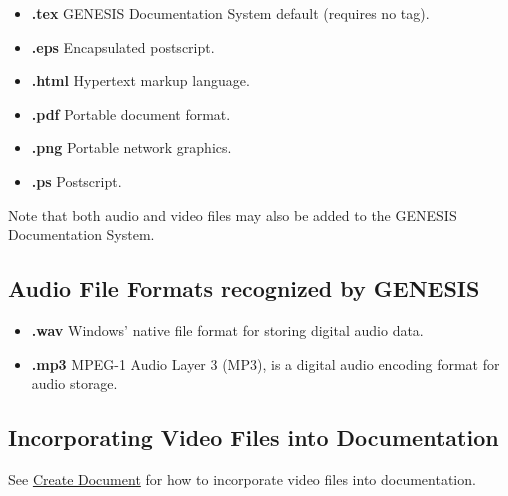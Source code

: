 \documentclass[12pt]{article}
\begin{document}
\begin{itemize}

\item[]{\bf .tex} GENESIS Documentation System default (requires no tag).
\item[]{\bf .eps} Encapsulated postscript.
\item[]{\bf .html} Hypertext markup language.
\item[]{\bf .pdf} Portable document format.
\item[]{\bf .png} Portable network graphics.
\item[]{\bf .ps} Postscript.

\end{itemize}
Note that both audio and video files may also be added to the GENESIS Documentation System.

\subsection*{Audio File Formats recognized by GENESIS}

\begin{itemize}

\item[]{\bf .wav} Windows' native file format for storing digital audio data.
\item[]{\bf .mp3} MPEG-1 Audio Layer 3 (MP3), is a digital audio encoding format for audio storage.

\end{itemize}

\subsection*{Incorporating Video Files into Documentation}

See \href{../document-create/document-create.tex}{Create Document} for how to incorporate video files into documentation.
\end{document}
